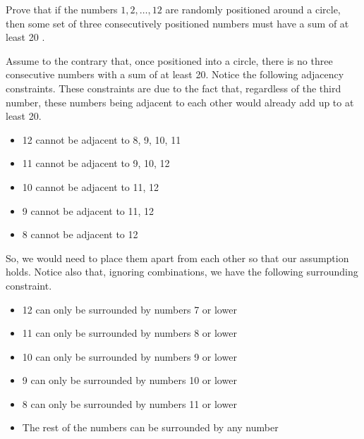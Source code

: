 \begin{hwproblem}{1}{
  Prove that if the numbers $1,2, \ldots, 12$ are randomly positioned around a 
  circle, then some set of three consecutively positioned numbers must have a 
  sum of at least 20 .
  }

  Assume to the contrary that, once positioned into a circle, there is no three
  consecutive numbers with a sum of at least 20. Notice the following adjacency
  constraints. These constraints are due to the fact that, regardless of the
  third number, these numbers being adjacent to each other would already add up
  to at least 20.
  \begin{itemize}
    \item 12 cannot be adjacent to 8, 9, 10, 11
    \item 11 cannot be adjacent to 9, 10, 12
    \item 10 cannot be adjacent to 11, 12
    \item 9 cannot be adjacent to 11, 12
    \item 8 cannot be adjacent to 12
  \end{itemize}
  So, we would need to place them apart from each other so that our
  assumption holds. Notice also that, ignoring combinations, we have the
  following surrounding constraint.
  \begin{itemize}
    \item 12 can only be surrounded by numbers 7 or lower
    \item 11 can only be surrounded by numbers 8 or lower
    \item 10 can only be surrounded by numbers 9 or lower
    \item 9 can only be surrounded by numbers 10 or lower
    \item 8 can only be surrounded by numbers 11 or lower
    \item The rest of the numbers can be surrounded by any number
  \end{itemize}
\end{hwproblem}

